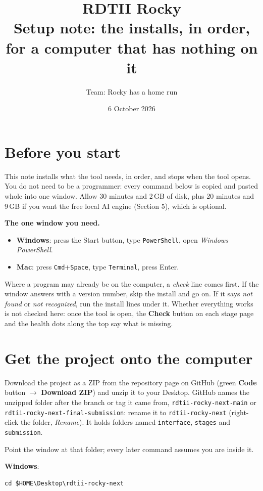 \documentclass[11pt,a4paper]{article}
\title{\textbf{RDTII Rocky}\\[2mm]
\large Setup note: the installs, in order, for a computer that has nothing on it}
\author{Team: Rocky has a home run}
\date{6 October 2026}
\newcommand{\win}{\textbf{Windows}}
\newcommand{\mac}{\textbf{Mac}}
\begin{document}
\maketitle

\section*{Before you start}

This note installs what the tool needs, in order, and stops when the tool opens. You do
not need to be a programmer: every command below is copied and pasted whole into one
window. Allow 30 minutes and 2\,GB of disk, plus 20 minutes and 9\,GB if you want the free
local AI engine (Section 5), which is optional.

\textbf{The one window you need.}
\begin{itemize}[leftmargin=1.2em]
  \item \win: press the Start button, type \texttt{PowerShell}, open \emph{Windows PowerShell}.
  \item \mac: press \texttt{Cmd}+\texttt{Space}, type \texttt{Terminal}, press Enter.
\end{itemize}

Where a program may already be on the computer, a \emph{check} line comes first. If the
window answers with a version number, skip the install and go on. If it says
\emph{not found} or \emph{not recognized}, run the install lines under it. Whether
everything works is not checked here: once the tool is open, the \textbf{Check} button on
each stage page and the health dots along the top say what is missing.

\section{Get the project onto the computer}

Download the project as a ZIP from the repository page on GitHub (green \textbf{Code}
button $\rightarrow$ \textbf{Download ZIP}) and unzip it to your Desktop. GitHub names the
unzipped folder after the branch or tag it came from, \texttt{rdtii-rocky-next-main} or
\texttt{rdtii-rocky-next-final-submission}: rename it to \texttt{rdtii-rocky-next}
(right-click the folder, \emph{Rename}). It holds folders named \texttt{interface},
\texttt{stages} and \texttt{submission}.

Point the window at that folder; every later command assumes you are inside it.

\win:
\begin{lstlisting}
cd $HOME\Desktop\rdtii-rocky-next
\end{lstlisting}
\end{document}
